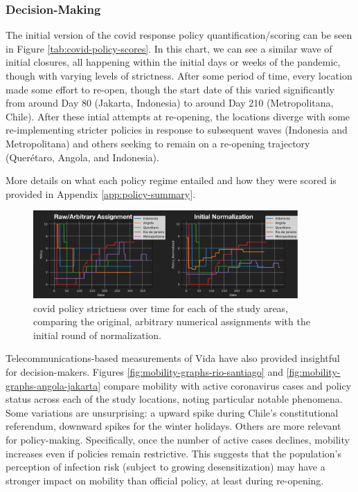 \subsubsection{Decision-Making} \label{sec:vida-evdt-decision-results}

The initial version of the \ac{covid} response policy quantification/scoring can be seen in Figure \ref{tab:covid-policy-scores}. In this chart, we can see a similar wave of initial closures, all happening within the initial days or weeks of the pandemic, though with varying levels of strictness. After some period of time, every location made some effort to re-open, though the start date of this varied significantly from around Day 80 (Jakarta, Indonesia) to around Day 210 (Metropolitana, Chile). After these intial attempts at re-opening, the locations diverge with some re-implementing stricter policies in response to subsequent waves (Indonesia and Metropolitana) and others seeking to remain on a re-opening trajectory (Querétaro, Angola, and Indonesia).

More details on what each policy regime entailed and how they were scored is provided in Appendix \ref{app:policy-summary}. 

\begin{figure}[!htb]
\centering
\includegraphics[width=0.9\textwidth]{Figures/chap5/policy-comparison.png}
\caption[COVID-19 Policy Strictness Over Time]{\ac{covid} policy strictness over time for each of the study areas, comparing the original, arbitrary numerical assignments with the initial round of normalization.}
\label{fig:policy-comparison}
\end{figure}

Telecommunications-based measurements of Vida have also provided insightful for decision-makers. Figures \ref{fig:mobility-graphs-rio-santiago} and \ref{fig:mobility-graphs-angola-jakarta} compare mobility with active coronavirus cases and policy status across each of the study locations, noting particular notable phenomena. Some variations are unsurprising: a upward spike during Chile's constitutional referendum, downward spikes for the winter holidays. Others are more relevant for policy-making. Specifically, once the number of active cases declines, mobility increases even if policies remain restrictive. This suggests that the population's perception of infection risk (subject to growing desensitization) may have a stronger impact on mobility than official policy, at least during re-opening.


